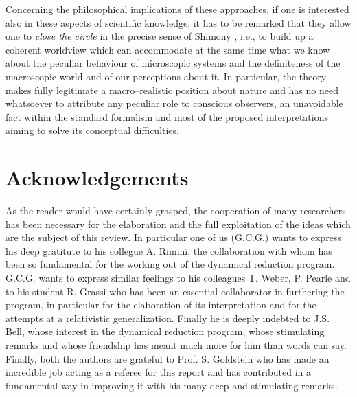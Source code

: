 \documentclass[10pt,a4paper]{article}
\begin{document}
Concerning the philosophical implications of these approaches, if
one is interested also in these aspects of scientific knowledge,
it has to be remarked that they allow one to {\it close the circle}
in the precise sense of Shimony \cite{shipcqf}, i.e., to build up
a coherent worldview which can accommodate  at the same time what
we know about the peculiar behaviour of microscopic systems and
the definiteness of the macroscopic world and of our perceptions
about it. In particular, the theory makes fully legitimate a
macro--realistic position about nature and has no need whatsoever
to attribute any peculiar role to conscious observers, an
unavoidable fact within the standard formalism and most of the
proposed interpretations aiming to solve its conceptual
difficulties.

\section*{Acknowledgements}

As the reader would have certainly grasped, the cooperation of
many researchers has been necessary for the elaboration and the
full exploitation of the ideas which are the subject of this
review. In particular one of us (G.C.G.) wants to express his deep
gratitute to his collegue  A. Rimini, the collaboration with whom
has been so fundamental for the working out of the dynamical
reduction program. G.C.G. wants to express similar feelings to his
colleagues T. Weber, P. Pearle and to his student R. Grassi who
has been an essential collaborator in furthering the program, in
particular for the elaboration of its interpretation and for the
attempts at a relativistic generalization. Finally he is deeply
indebted to J.S. Bell, whose interest in the dynamical reduction
program, whose stimulating remarks and whose friendship has meant
much more for him than words can say. Finally, both the authors
are grateful to Prof. S. Goldstein who has made an incredible job
acting as a referee for this report and has contributed in a
fundamental way in improving it with his many deep and stimulating
remarks.
\end{document}
